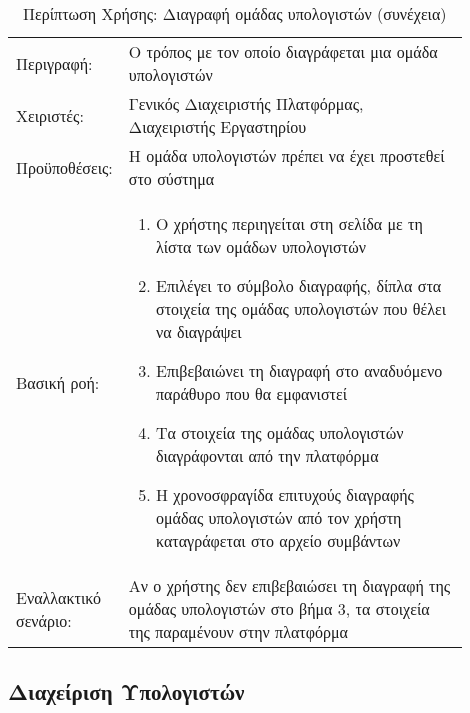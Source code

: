 %
%
\begin{longtable}{|p{0.14\linewidth}|p{0.76\linewidth}|}
	\caption{Περίπτωση Χρήσης: Διαγραφή ομάδας υπολογιστών} \label{tab:use-case-delete-group} \\ \hline \endfirsthead
	\caption[{}]{Περίπτωση Χρήσης: Διαγραφή ομάδας υπολογιστών (συνέχεια)} \\ \endhead \endfoot
	Περιγραφή: & Ο τρόπος με τον οποίο διαγράφεται μια ομάδα υπολογιστών \\ \hline
	Χειριστές: & Γενικός Διαχειριστής Πλατφόρμας, Διαχειριστής Εργαστηρίου \\ \hline
	Προϋποθέσεις: & Η ομάδα υπολογιστών πρέπει να έχει προστεθεί στο σύστημα \\ \hline
	Βασική ροή: &
	\begin{enumerate}
		\vspace{-1cm}
		\addtolength{\itemindent}{-0.4cm}
		\item Ο χρήστης περιηγείται στη σελίδα με τη λίστα των ομάδων υπολογιστών
		\item Επιλέγει το σύμβολο διαγραφής, δίπλα στα στοιχεία της ομάδας υπολογιστών που θέλει να διαγράψει
		\item Επιβεβαιώνει τη διαγραφή στο αναδυόμενο παράθυρο που θα εμφανιστεί
		\item Τα στοιχεία της ομάδας υπολογιστών διαγράφονται από την πλατφόρμα
		\item Η χρονοσφραγίδα επιτυχούς διαγραφής ομάδας υπολογιστών από τον χρήστη καταγράφεται στο αρχείο συμβάντων
		\vspace{-0.7cm}
	\end{enumerate} \\ \hline
	Εναλλακτικό σενάριο: & Αν ο χρήστης δεν επιβεβαιώσει τη διαγραφή της ομάδας υπολογιστών στο βήμα 3, τα στοιχεία της παραμένουν στην πλατφόρμα \\ \hline
\end{longtable}

\subsection{Διαχείριση Υπολογιστών}

